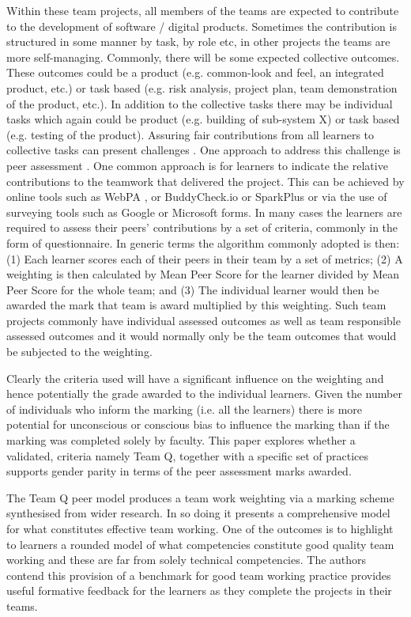 \documentclass[sigconf, anonymous=true]{acmart}
\begin{document}
Within these team projects, all members of the teams are expected to contribute to the  development of software / digital products. Sometimes the contribution is structured in some manner by task, by role etc, in other projects the teams are more self-managing. Commonly, there will be some expected collective outcomes. These outcomes could be a product (e.g. common-look and feel, an integrated product, etc.) or task based (e.g. risk analysis, project plan, team demonstration of the product, etc.).  In addition to the collective tasks there may be individual tasks which again could be product (e.g. building of sub-system X) or task based (e.g. testing of the product). Assuring fair contributions from all learners to collective tasks can present challenges \cite{Philips21}. One approach to address this challenge is peer assessment \cite{Gordon2010}. One common approach is for learners to indicate the relative contributions to the teamwork that delivered the project. This can be achieved by online tools such as WebPA \cite{WebPA}, or BuddyCheck.io \cite{BuddyCheck} or SparkPlus \cite{SparkPlus} or via the use of surveying tools such as Google or Microsoft forms. In many cases the learners are required to assess their peers' contributions by a set of criteria, commonly in the form of questionnaire.  In generic terms the algorithm commonly adopted is then: (1) Each learner scores each of their peers in their team by a set of metrics; (2) A weighting is then calculated by Mean Peer Score for the learner divided by Mean Peer Score for the whole team; and (3) The individual learner would then be awarded the mark that team is award multiplied by this weighting. Such team projects commonly have individual assessed outcomes as well as team responsible assessed outcomes and it would normally only be the team outcomes that would be subjected to the weighting.

Clearly the criteria used will have a significant influence on the weighting and hence potentially the grade awarded to the individual learners.  Given the number of individuals who inform the marking (i.e. all the learners) there is more potential for unconscious or conscious bias to influence the marking than if the marking was completed solely by faculty. This paper explores whether a validated, criteria namely Team Q, \cite{Britton2017} together with a specific set of practices supports gender parity in terms of the peer assessment marks awarded. 
  
The Team Q peer model produces a team work weighting via a marking scheme synthesised from wider research. In so doing it presents a comprehensive model for what constitutes effective team working. One of the outcomes is to highlight to learners a rounded model of what competencies constitute good quality team working and these are far from solely technical competencies. The authors contend this provision of a benchmark for good team working practice provides useful formative feedback for the learners as they complete the projects in their teams.
\end{document}
